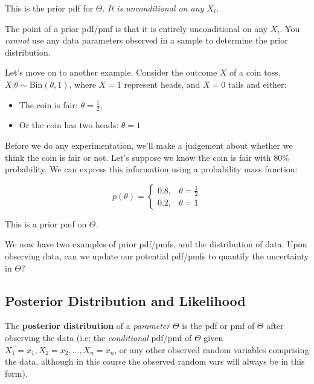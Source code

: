 \documentclass[a4paper]{article}
\begin{document}
                This is the prior pdf for $\Theta$. \textit{It is unconditional
                on any $X_i$.}

                \begin{warn}
                    The point of a prior pdf/pmf is that it is entirely
                    unconditional on any $X_i$. You \textit{cannot} use any data
                    parameters observed in a sample to determine the prior
                    distribution.
                \end{warn}

                Let's move on to another example. Consider the outcome $X$ of a
                coin toss. $X | \theta \sim \text{Bin}(\theta, 1)$, where $X =
                1$ represent heads, and $X = 0$ tails and either:

                \begin{itemize}
                    \item The coin is fair: $\theta = \frac{1}{2}$,
                    \item Or the coin has two heads: $\theta = 1$
                \end{itemize}

                Before we do any experimentation, we'll make a judgement about
                whether we think the coin is fair or not. Let's suppose we know
                the coin is fair with 80\% probability. We can express this
                information using a probability mass function:

                \[
                    p(\theta) = \begin{cases}0.8, & \theta = \frac{1}{2} \\ 0.2,
                    & \theta = 1\end{cases}
                \]

                This is a prior pmf on $\Theta$.

                We now have two examples of prior pdf/pmfs, and the distribution
                of data. Upon observing data, can we update our potential
                pdf/pmfs to quantify the uncertainty in $\Theta$?

        \subsection{Posterior Distribution and Likelihood}
            \begin{definition}
                The \textbf{posterior distribution} of a \textit{parameter}
                $\Theta$ is the pdf or pmf of $\Theta$ after observing the data
                (i.e: the \textit{conditional} pdf/pmf of $\Theta$ given $X_1 =
                x_1, X_2 = x_2, ..., X_n = x_n$, or any other observed random
                variables comprising the data, although in this course the
                observed random vars will always be in this form).
            \end{definition}
\end{document}
